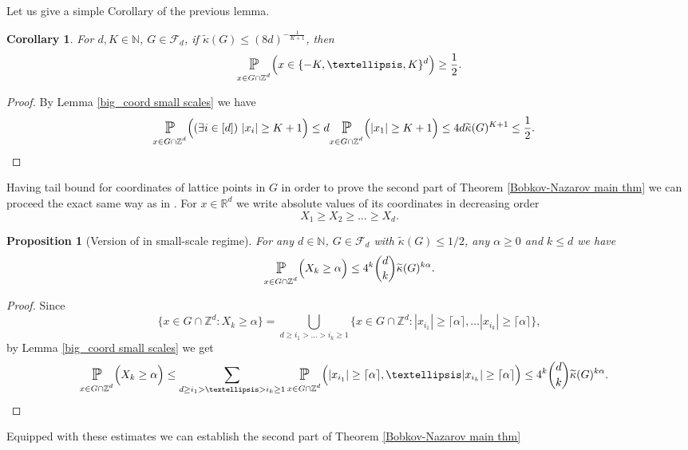 \documentclass[10pt,a4paper]{amsart}
\numberwithin{equation}{section}
\newtheorem{Cor}[Thm]{Corollary}
\newtheorem{Prop}[Thm]{Proposition}
\newcommand{\Pro}{\mathop{\mathbb{P}}}
\newcommand{\Z}{\mathbb{Z}}
\newcommand{\R}{\mathbb{R}}
\newcommand{\N}{\mathbb{N}}
\newcommand{\spr}[1]{\underset{_{\substack{#1}}}{\mathlarger{\mathlarger{\Pro}}}}
\begin{document}
Let us give a simple Corollary of the previous lemma.
\begin{Cor} \label{small scales no big coord}
    For $d,K \in \N$, $G \in \mathcal{F}_d$, if $\widetilde{\kappa}(G) \le (8d)^{- \frac{1}{K+1}}$, then 
    \[
    \spr{x \in G \cap \Z^d} \Big(x \in \{-K, \ldots, K \}^d \Big) \ge \frac{1}{2} .
    \]
\end{Cor}
\begin{proof}
    By Lemma \ref{big_coord small scales} we have
    \begin{align*}
        &\spr{x \in G \cap \Z^d} \Big( (\exists i \in [d]) \ |x_i| \ge K+1 \Big) \le d\spr{x \in G \cap \Z^d} \Big( |x_1| \ge K+1 \Big)\le 4d \widetilde{\kappa}(G)^{K+1}  \le \frac{1}{2} .
    \end{align*}
\end{proof}
Having tail bound for coordinates of lattice points in $G$ in order to prove the second part of Theorem \ref{Bobkov-Nazarov main thm} we can proceed the exact same way as in \cite[Sections 4,5]{bob-naz}.
For $x \in \R^d$ we write absolute values of its coordinates in decreasing order
\[
X_1 \ge X_2 \ge \ldots \ge X_d.
\]
\begin{Prop}[Version of {\cite[Proposition 4.1]{bob-naz}} in small-scale regime] \label{small scale ordered tail bound}
    For any $d \in \N$, $G \in \mathcal{F}_d$ with $\widetilde{\kappa}(G) \le 1/2$, any $\alpha \ge 0$ and $k \le d$ we have
    \[
   \spr{x \in G \cap \Z^d} \Big( X_k \ge \alpha \Big)\le 4^k \binom{d}{k} \widetilde{\kappa}(G)^{k\alpha} .
    \]
\end{Prop}
\begin{proof}
    Since 
    \[
    \Big\{ x \in G \cap \Z^d: X_k \ge \alpha \Big\}= \bigcup_{d \ge i_1 > \ldots>i_k \ge 1} \Big\{x \in G \cap \Z^d:|x_{i_1}| \ge \lceil \alpha \rceil,\ldots |x_{i_k}| \ge \lceil \alpha \rceil \Big\},
    \]
by Lemma \ref{big_coord small scales} we get 
\begin{align*}
    \spr{x \in G \cap \Z^d} \Big( X_k \ge \alpha \Big) &\le \sum_{d \ge i_1 > \ldots>i_k \ge 1} \spr{x \in G \cap \Z^d} \Big(|x_{i_1}| \ge \lceil \alpha \rceil,\ldots |x_{i_k}| \ge \lceil \alpha \rceil \Big) \le 4^k \binom{d}{k} \widetilde{\kappa}(G)^{k\alpha}.
\end{align*}
\end{proof}
Equipped with these estimates we can establish the second part of Theorem \ref{Bobkov-Nazarov main thm} 
\end{document}
